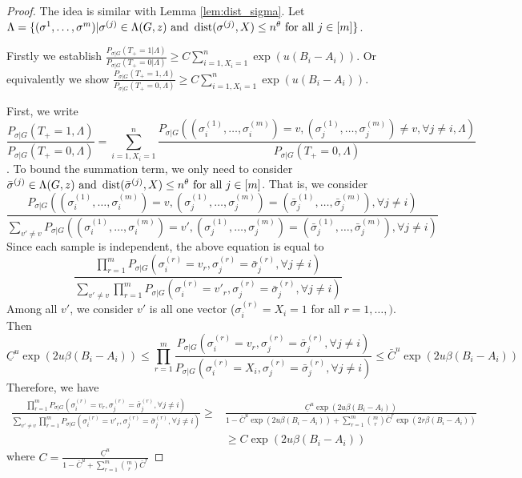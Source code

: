 \documentclass{article}
\begin{document}
\begin{proof}
	The idea is similar with Lemma \ref{lem:dist_sigma}.
	Let $\Lambda = \{(\sigma^{1}, \dots, \sigma^{m}) |
	  \sigma^{(j)}\in  \Lambda(G, z)
\text{~and~} \operatorname{dist}(\sigma^{(j)}, X) \le n^\theta
\text{~for all~} j\in[m] 
	\}$.
	
	Firstly
	we establish $\frac{P_{\sigma | G}(T_+ = 1 | \Lambda ) }{P_{\sigma | G}(T_+ = 0 | \Lambda )} \geq C\sum_{i=1, X_i=1}^n \exp(u(B_i - A_i))$.
	Or equivalently we show $\frac{P_{\sigma | G}(T_+ = 1, \Lambda ) }{P_{\sigma | G}(T_+ = 0, \Lambda )} \geq C\sum_{i=1, X_i=1}^n \exp(u(B_i - A_i))$.
	
	First, we write $$
	\frac{P_{\sigma | G}(T_+ = 1, \Lambda )}{P_{\sigma | G}(T_+ = 0, \Lambda )} =
	\sum_{i=1, X_i=1}^n \frac{P_{\sigma | G}( (\sigma_i^{(1)}, \dots ,\sigma_i^{(m)}) = v, (\sigma_j^{(1)}, \dots ,\sigma_j^{(m)}) \neq v, \forall j \neq i, \Lambda)}
	{P_{\sigma | G}(T_+ = 0, \Lambda)}
	$$.
	To bound the summation term, we only need to consider
	$\bar{\sigma}^{(j)}\in  \Lambda(G, z)
	\text{~and~} \operatorname{dist}(\bar{\sigma}^{(j)}, X) \le n^\theta
	\text{~for all~} j\in[m]$.
	That is, we consider
	$$
	\frac{P_{\sigma | G}( (\sigma_i^{(1)}, \dots ,\sigma_i^{(m)}) = v,  (\sigma_j^{(1)}, \dots ,\sigma_j^{(m)}) = (\bar{\sigma}_j^{(1)}, \dots ,\bar{\sigma}_j^{(m)}), \forall j \neq i)}
	{\sum_{v' \neq v} P_{\sigma | G}((\sigma_i^{(1)}, \dots ,\sigma_i^{(m)}) = v',  (\sigma_j^{(1)}, \dots ,\sigma_j^{(m)}) = (\bar{\sigma}_j^{(1)}, \dots ,\bar{\sigma}_j^{(m)}), \forall j \neq i)}
	$$
	Since each sample is independent, the above equation is equal to
	$$
	\frac{ \prod_{r=1}^m	P_{\sigma | G}(\sigma_i^{(r)} = v_r, \sigma_j^{(r)} =\bar{\sigma}_j^{(r)}, \forall j \neq i)}
	{\sum_{v' \neq v} \prod_{r=1}^m P_{\sigma | G}( \sigma_i^{(r)} = v'_r,
	\sigma_j^{(r)} = \bar{\sigma}_j^{(r)}, \forall j \neq i)}
	$$
	Among all $v'$, we consider $v'$ is all one vector ($\sigma_i^{(r)} = X_i = 1$ for all $r=1, \dots, )$. Then
	$$
 \underline{C}^u \exp(2u\beta(B_i - A_i)) \leq	\prod_{r=1}^m \frac{
		P_{\sigma | G}(\sigma_i^{(r)} = v_r, \sigma_j^{(r)} =\bar{\sigma}_j^{(r)}, \forall j \neq i)}
	{ P_{\sigma | G}( \sigma_i^{(r)} = X_i,
		\sigma_j^{(r)} = \bar{\sigma}_j^{(r)}, \forall j \neq i)} \leq \bar{C}^u \exp(2u\beta(B_i - A_i))
	$$
	Therefore, we have
	\begin{align*}
	\frac{ \prod_{r=1}^m	P_{\sigma | G}(\sigma_i^{(r)} = v_r, \sigma_j^{(r)} =\bar{\sigma}_j^{(r)}, \forall j \neq i)}
	{\sum_{v' \neq v} \prod_{r=1}^m P_{\sigma | G}( \sigma_i^{(r)} = v'_r,
		\sigma_j^{(r)} = \bar{\sigma}_j^{(r)}, \forall j \neq i)} \geq & \frac{\underline{C}^u \exp(2u\beta(B_i - A_i))}{
	1 - \bar{C}^u \exp(2u\beta(B_i - A_i))+ \sum_{r=1}^m \binom{m}{r} \bar{C}^r \exp(2r\beta(B_i - A_i))
	} \\
	& \geq C \exp(2u\beta(B_i - A_i))
	\end{align*}
	where $C = \frac{\underline{C}^u}{1- \bar{C}^u + \sum_{r=1}^m \binom{m}{r} \bar{C}^r }$
	

\end{proof}
\end{document}
